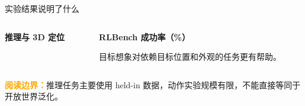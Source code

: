\documentclass[aspectratio=169,11pt]{ctexbeamer}
\newcommand{\orangebold}[1]{\textcolor{Orange}{\textbf{#1}}}
\newcommand{\insertframesource}{}
\newcommand{\setsource}[1]{\gdef\insertframesource{#1}}
\begin{document}
\setsource{Ref.: [1] H. Zhen \emph{et al.}, ``3D-VLA: A 3D Vision-Language-Action Generative World Model,'' in \emph{Proc. ICML}, vol. 235, 2024, Tables 1--2 and 5--6.}
\begin{frame}{实验结果说明了什么}
\begin{columns}[T,onlytextwidth]
\begin{column}{0.48\textwidth}
\textbf{推理与 3D 定位}\par\vspace{0.12cm}
\renewcommand{\arraystretch}{1.18}
\vspace{0.22cm}{\scriptsize * CoVLM 使用真实深度进行 2D 到 3D 投影。}
\end{column}
\begin{column}{0.46\textwidth}
\textbf{RLBench 成功率（\%）}\par\vspace{0.12cm}
\renewcommand{\arraystretch}{1.18}
\vspace{0.30cm}目标想象对依赖目标位置和外观的任务更有帮助。
\end{column}
\end{columns}
\vspace{0.38cm}\orangebold{阅读边界：}推理任务主要使用 held-in 数据，动作实验规模有限，不能直接等同于开放世界泛化。
\end{frame}
\end{document}
